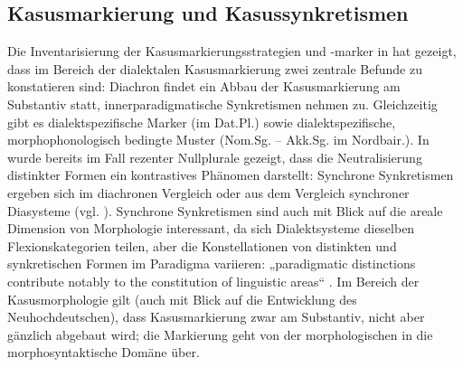 \subsection{Kasusmarkierung und Kasussynkretismen}\label{sec:7.2.2}\largerpage
\begin{sloppypar}
Die Inventarisierung der Kasusmarkierungsstrategien und -marker in  hat gezeigt, dass im Bereich der dialektalen Kasusmarkierung zwei zentrale Befunde zu konstatieren sind: Diachron findet ein Abbau der Kasusmarkierung am Substantiv statt, innerparadigmatische Synkretismen nehmen zu. Gleichzeitig gibt es dialektspezifische Marker (im Dat.Pl.) sowie dialektspezifische, morphophonologisch bedingte Muster (Nom.Sg.  -- Akk.Sg.   im Nordbair.). In  wurde bereits im Fall rezenter Nullplurale gezeigt, dass die Neutralisierung distinkter Formen ein kontrastives Phänomen darstellt: Synchrone Synkretismen ergeben sich im diachronen Vergleich oder aus dem Vergleich synchroner Diasysteme (vgl. \citealt[1170]{Panzer1983}). Synchrone Synkretismen sind auch mit Blick auf die areale Dimension von Morphologie interessant, da sich Dialektsysteme dieselben Flexionskategorien teilen, aber die Konstellationen von distinkten und synkretischen Formen im Paradigma variieren: „paradigmatic distinctions contribute notably to the constitution of linguistic areas“ \citep[808]{Rabanus2010}. Im Bereich der Kasusmorphologie gilt (auch mit Blick auf die Entwicklung des Neuhochdeutschen), dass Kasusmarkierung zwar am Substantiv, nicht aber gänzlich abgebaut wird; die Markierung geht von der morphologischen in die morphosyntaktische Domäne über.
\end{sloppypar}

